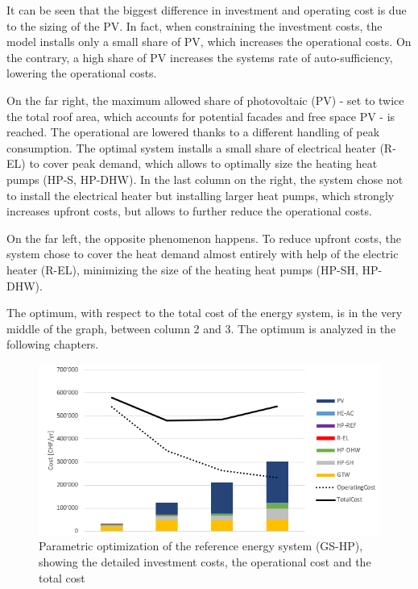 \documentclass{article}
\begin{document}
It can be seen that the biggest difference in investment and operating cost is due to the sizing of the PV. In fact, when constraining the investment costs, the model installs only a small share of PV, which increases the operational costs. On the contrary, a high share of PV increases the systems rate of auto-sufficiency, lowering the operational costs. 

On the far right, the maximum allowed share of photovoltaic (PV) - set to twice the total roof area, which accounts for potential facades and free space PV - is reached. The operational are lowered thanks to a different handling of peak consumption. The optimal system installs a small share of electrical heater (R-EL) to cover peak demand, which allows to optimally size the heating heat pumps (HP-S, HP-DHW). In the last column on the right, the system chose not to install the electrical heater but installing larger heat pumps, which strongly increases upfront costs, but allows to further reduce the operational costs.

On the far left, the opposite phenomenon happens. To reduce upfront costs, the system chose to cover the heat demand almost entirely with help of the electric heater (R-EL), minimizing the size of the heating heat pumps (HP-SH, HP-DHW).

The optimum, with respect to the total cost of the energy system, is in the very middle of the graph, between column 2 and 3. The optimum is analyzed in the following chapters.

\begin{figure}[htp]
	\centering
	\includegraphics[width=1\textwidth]{V_G_PO1.png}
	\caption{Parametric optimization of the reference energy system (GS-HP), showing the detailed investment costs, the operational cost and the total cost}
	\label{fig:V_G_PO}
\end{figure}
\end{document}
